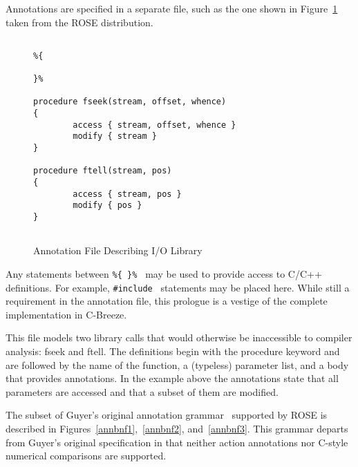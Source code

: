 \documentclass[times, 10pt]{article}
\begin{document}
Annotations are specified in a separate file, such as the one shown
in Figure~\ref{figure:annfile} taken
from the ROSE distribution.

\begin{figure}
\begin{verbatim}

%{

}%

procedure fseek(stream, offset, whence)
{
        access { stream, offset, whence }
        modify { stream }
}
 
procedure ftell(stream, pos)
{
        access { stream, pos }
        modify { pos }
}
 
\end{verbatim}
\caption{Annotation File Describing I/O Library}
\label{figure:annfile}
\end{figure}

Any statements between {\tt \%\{ \}\% } may be used to provide access to C/C++
definitions.  For example, {\tt \#include } statements may be placed here.
While still a requirement in the annotation file, this prologue is
a vestige of the complete implementation in C-Breeze.

This file models two library calls that would otherwise be inaccessible
to compiler analysis:  fseek and ftell.  The definitions begin with the
procedure keyword and are followed by the name of the function, a
(typeless) parameter list, and a body that provides annotations.
In the example above the annotations state that all parameters are
accessed and that a subset of them are modified.

The subset of Guyer's original annotation grammar~\cite{guyer03} supported 
by ROSE is described in Figures~\ref{annbnf1},~\ref{annbnf2}, 
and~\ref{annbnf3}.  This grammar departs from Guyer's original specification
in that neither action annotations nor C-style numerical comparisons
are supported.
\end{document}
